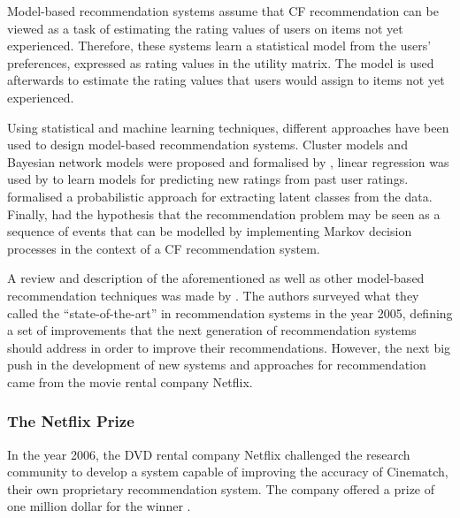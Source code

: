 Model-based recommendation systems assume that CF recommendation can be viewed as a task of estimating the rating values of users on items not yet experienced.
Therefore, these systems learn a statistical model from the users' preferences, expressed as rating values in the utility matrix. The model is used afterwards to estimate the rating values that users would assign to items not yet experienced.

Using statistical and machine learning techniques, different  approaches have been used to design model-based recommendation systems. Cluster models and Bayesian network models were proposed and formalised by \textcite{breese98empirical}, linear regression was used by \textcite{sarwar01item} to learn models for predicting new ratings from past user ratings. \textcite{hofmann03collaborative} formalised a probabilistic approach for extracting latent classes from the data. Finally, \textcite{shani05mdp} had the hypothesis that the recommendation problem may be seen as a sequence of events that can be modelled by  implementing Markov decision processes in the context of a CF recommendation system. 

A review and description of the aforementioned as well as other model-based recommendation techniques was made by \textcite{adomavicius05toward}. 
The authors surveyed what they called the ``state-of-the-art'' in recommendation systems in the year 2005, defining a set of improvements that the next generation of recommendation systems should address in order to improve their recommendations.
However, the next big push in the development of new systems and approaches for recommendation came from the movie rental company Netflix. 


\subsubsection{The Netflix Prize}\label{sub:netflix}
In the year 2006, the DVD rental company Netflix challenged the research community to develop a system capable of improving the accuracy of Cinematch, their own proprietary recommendation system. The company offered a prize of one million dollar for the winner \autocite{bennet07netflix}.
 
